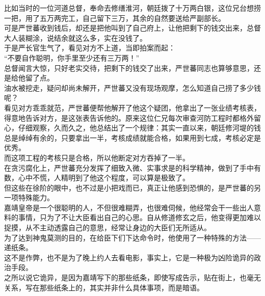 \begin{multicols}{\theparacolNo}
比如当时的一位河道总督，奉命去修缮淮河，朝廷拨了十万两白银，这位兄台想捞一把，用了五万两完工，自己留下三万，其余的自然要送给严副部长。\\

可是严世蕃收到钱后，却还是把他叫到了自己府上，让他把剩下的钱交出来，总督大人装糊涂，说结余就这么多，实在没钱了。\\

于是严长官生气了，看见对方不上道，当即拍案而起：\\

“不要自作聪明，你手里至少还有三万两！”\\

总督闻言大惊，只好老实交待，把剩下的钱交了出来，严世蕃同志也算够意思，还是给他留了点。\\

油水被挖走，疑问却尚未解开，严世蕃又没有现场观摩，怎么知道自己捞了多少钱呢？\\

看见对方乖乖就范，严世蕃便帮他解开了他这个疑团，他拿出了一张业绩考核表，得意地告诉对方，是这张表告诉他的。原来这位仁兄每次审查河防工程时都格外留心，仔细观察，久而久之，他总结出了一个规律：其实一直以来，朝廷修河堤的钱总是绰绰有余的，只要拿出一半，考核成绩就能合格，如果用到七成，考核必定是优秀。\\

而这项工程的考核只是合格，所以他断定对方吞掉了一半。\\

在贪污腐化上，严世蕃充分发挥了细致入微、实事求是的科学精神，做到了手中有数，心中不慌，人精明到了他这个程度，可以算是极致了。\\

但这些在徐阶的眼中，也不过是小把戏而已，真正让他感到恐惧的，是严世蕃的另一项特殊能力。\\

嘉靖皇帝是一个很聪明的人，不但很难糊弄，也很难伺候，他经常会干一些出人意料的事情，只为了不让大臣看出自己的心思。自从修道修玄之后，他变得更加难以捉摸，从不主动透露自己的意思，经常让身边的大臣们无所适从。\\

为了达到神鬼莫测的目的，在给臣下们下达命令时，他使用了一种特殊的方法——递纸条。\\

这不是作弊，也不是为了晚上约人去看电影，事实上，它是一种极为凶险诡异的政治手段。\\

之所以说它诡异，是因为嘉靖写下的那些纸条，即使写成告示，贴在街上，也毫无关系，写在那些纸条上的，其实并非什么具体事项，而是暗语。\\


\end{multicols}
